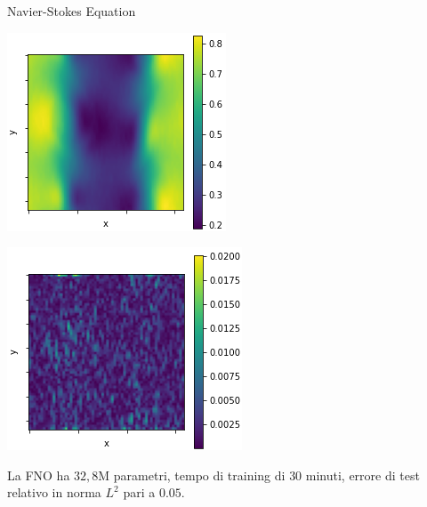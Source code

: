 \documentclass[aspectratio=169]{beamer}
\begin{document}
\begin{frame}[t]{Navier-Stokes Equation}
\begin{center}
\begin{minipage}{0.24\textwidth}
        \end{minipage}
        \hfill
        \begin{minipage}{0.24\textwidth}
            \includegraphics[width=\textwidth]{operators/shearLayer/FNOappro.png}
        \end{minipage}
        \hfill
        \begin{minipage}{0.24\textwidth}
            \includegraphics[width=\textwidth]{operators/shearLayer/error.png}
        \end{minipage}
    \end{center}
    La FNO ha $32,8$M parametri, tempo di training di $30$ minuti, errore di test relativo in norma $L^{2}$ pari a $0.05$.
\end{frame}
\end{document}
